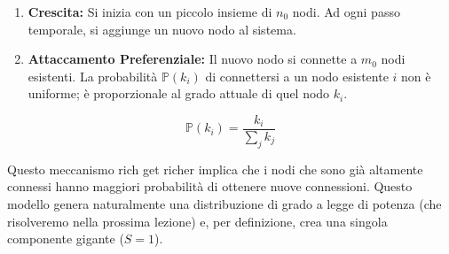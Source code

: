 \begin{enumerate}
\item \textbf{Crescita:} Si inizia con un piccolo insieme di $n_0$ nodi. Ad ogni passo temporale, si aggiunge un nuovo nodo al sistema.
\item \textbf{Attaccamento Preferenziale:} Il nuovo nodo si connette a $m_0$ nodi esistenti. La probabilità $\mathbb{P}(k_i)$ di connettersi a un nodo esistente $i$ non è uniforme; è proporzionale al grado attuale di quel nodo $k_i$.
\end{enumerate}
\begin{tcolorbox}[colback=yellow!25, colframe=yellow!75!orange, coltitle=black, title=\textbf{Regola dell'Attaccamento Preferenziale}]
\begin{equation} \label{eq:ba}
\mathbb{P}(k_i) = \frac{k_i}{\sum_j k_j}
\end{equation}
\end{tcolorbox}

Questo meccanismo rich get richer implica che i nodi che sono già altamente connessi hanno maggiori probabilità di ottenere nuove connessioni. Questo modello genera naturalmente una distribuzione di grado a legge di potenza (che risolveremo nella prossima lezione) e, per definizione, crea una singola componente gigante ($S=1$).

